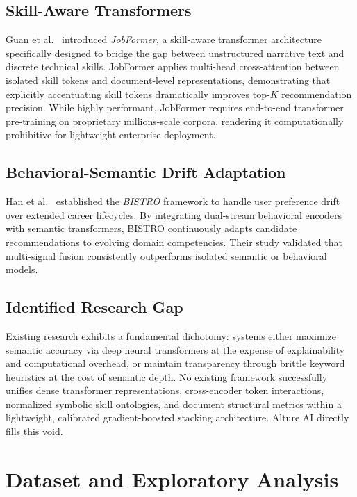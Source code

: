 \documentclass[conference]{IEEEtran}
\begin{document}
\subsection{Skill-Aware Transformers}
Guan et al.~\cite{guan2024} introduced \textit{JobFormer}, a skill-aware transformer architecture specifically designed to bridge the gap between unstructured narrative text and discrete technical skills. JobFormer applies multi-head cross-attention between isolated skill tokens and document-level representations, demonstrating that explicitly accentuating skill tokens dramatically improves top-$K$ recommendation precision. While highly performant, JobFormer requires end-to-end transformer pre-training on proprietary millions-scale corpora, rendering it computationally prohibitive for lightweight enterprise deployment.

\subsection{Behavioral-Semantic Drift Adaptation}
Han et al.~\cite{han2024} established the \textit{BISTRO} framework to handle user preference drift over extended career lifecycles. By integrating dual-stream behavioral encoders with semantic transformers, BISTRO continuously adapts candidate recommendations to evolving domain competencies. Their study validated that multi-signal fusion consistently outperforms isolated semantic or behavioral models.

\subsection{Identified Research Gap}
Existing research exhibits a fundamental dichotomy: systems either maximize semantic accuracy via deep neural transformers at the expense of explainability and computational overhead, or maintain transparency through brittle keyword heuristics at the cost of semantic depth. No existing framework successfully unifies dense transformer representations, cross-encoder token interactions, normalized symbolic skill ontologies, and document structural metrics within a lightweight, calibrated gradient-boosted stacking architecture. Alture AI directly fills this void.

\section{Dataset and Exploratory Analysis}
\end{document}
